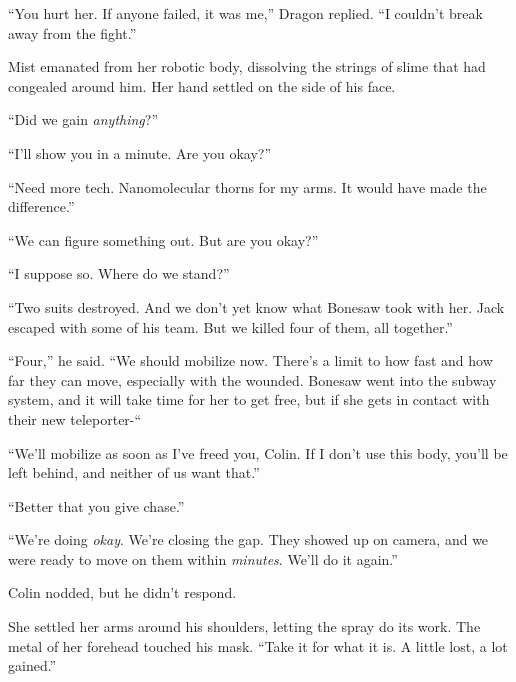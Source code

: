 ``You hurt her.  If anyone failed, it was me,'' Dragon replied.  ``I couldn't break away from the fight.''



Mist emanated from her robotic body, dissolving the strings of slime that had congealed around him.  Her hand settled on the side of his face.



``Did we gain \emph{anything}?''



``I'll show you in a minute.  Are you okay?''



``Need more tech.  Nanomolecular thorns for my arms.  It would have made the difference.''



``We can figure something out.  But are you okay?''



``I suppose so.  Where do we stand?''



``Two suits destroyed.  And we don't yet know what Bonesaw took with her.  Jack escaped with some of his team.  But we killed four of them, all together.''



``Four,'' he said.  ``We should mobilize now.  There's a limit to how fast and how far they can move, especially with the wounded.  Bonesaw went into the subway system, and it will take time for her to get free, but if she gets in contact with their new teleporter-``



``We'll mobilize as soon as I've freed you, Colin.  If I don't use this body, you'll be left behind, and neither of us want that.''



``Better that you give chase.''



``We're doing \emph{okay}.  We're closing the gap.  They showed up on camera, and we were ready to move on them within \emph{minutes}.  We'll do it again.''



Colin nodded, but he didn't respond.



She settled her arms around his shoulders, letting the spray do its work.  The metal of her forehead touched his mask.  ``Take it for what it is.  A little lost, a lot gained.''



